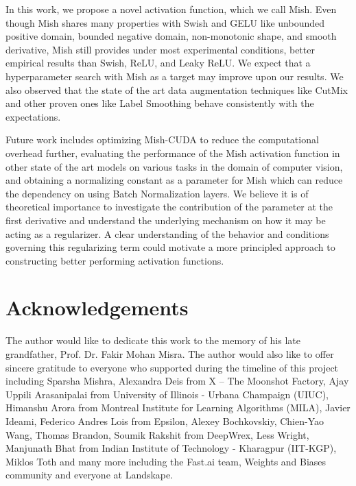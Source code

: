 \documentclass{bmvc2k}
\begin{document}
In this work, we propose a novel activation function, which we call Mish. Even though Mish shares many properties with Swish and GELU like unbounded positive domain, bounded negative domain, non-monotonic shape, and smooth derivative, Mish still provides under most experimental conditions, better empirical results than Swish, ReLU, and Leaky ReLU. We expect that a hyperparameter search with Mish as a target may improve upon our results. We also observed that the state of the art data augmentation techniques like CutMix and other proven ones like Label Smoothing behave consistently with the expectations. 

Future work includes optimizing Mish-CUDA to reduce the computational overhead further, evaluating the performance of the Mish activation function in other state of the art models on various tasks in the domain of computer vision, and obtaining a normalizing constant as a parameter for Mish which can reduce the dependency on using Batch Normalization layers. We believe it is of theoretical importance to investigate the contribution of the  parameter at the first derivative and understand the underlying mechanism on how it may be acting as a regularizer. A clear understanding of the behavior and conditions governing this regularizing term could motivate a more principled approach to constructing better performing activation functions. 

\section{Acknowledgements}

The author would like to dedicate this work to the memory of his late grandfather, Prof. Dr. Fakir Mohan Misra. The author would also like to offer sincere gratitude to everyone who supported during the timeline of this project including Sparsha Mishra, Alexandra Deis from X – The Moonshot Factory, Ajay Uppili Arasanipalai from University of Illinois - Urbana Champaign (UIUC), Himanshu Arora from Montreal Institute for Learning Algorithms (MILA), Javier Ideami, Federico Andres Lois from Epsilon, Alexey Bochkovskiy, Chien-Yao Wang, Thomas Brandon, Soumik Rakshit from DeepWrex, Less Wright, Manjunath Bhat from Indian Institute of Technology - Kharagpur (IIT-KGP), Miklos Toth and many more including the Fast.ai team, Weights and Biases community and everyone at Landskape.


\end{document}
